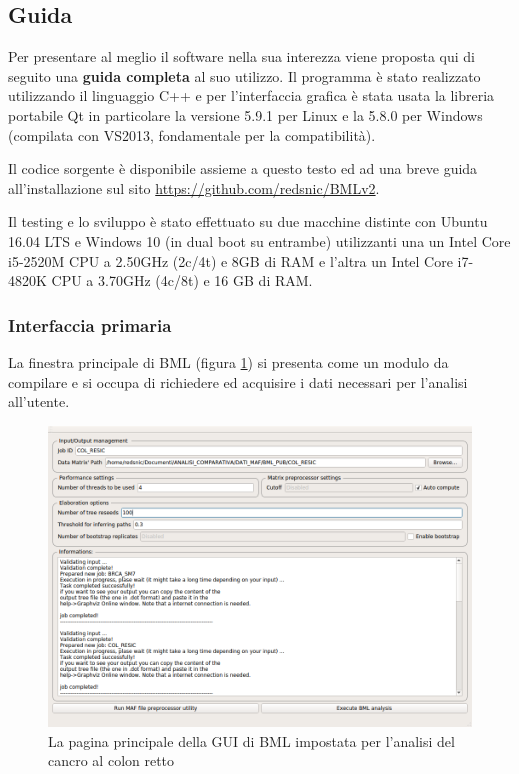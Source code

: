 \documentclass[a4paper]{article}
\begin{document}
	\subsection{\large Guida}

	Per presentare al meglio il software nella sua interezza viene proposta qui di seguito una \textbf{guida completa} al suo utilizzo. Il programma è stato realizzato utilizzando
	il linguaggio C++ e per l'interfaccia grafica è stata usata la libreria portabile Qt \cite{Qt} in particolare la versione 5.9.1 per Linux e la 
	5.8.0 per Windows (compilata con VS2013, fondamentale per la compatibilità).

	Il codice sorgente è disponibile assieme a questo testo ed ad una breve guida all'installazione sul sito \href{https://github.com/redsnic/BMLv2}{https://github.com/redsnic/BMLv2}.

	Il testing e lo sviluppo è stato effettuato su due macchine distinte con Ubuntu 16.04 LTS e Windows 10 (in dual boot su entrambe) utilizzanti una 
	un Intel Core i5-2520M CPU a 2.50GHz (2c/4t) e 8GB di RAM e l'altra un Intel Core i7-4820K CPU a 3.70GHz (4c/8t) e 16 GB di RAM.

	\subsubsection{Interfaccia primaria}
	
	La finestra principale di BML (figura \ref{fig:BMLMainMenu}) si presenta come un modulo da compilare
	e si occupa di richiedere ed acquisire i dati necessari per l'analisi 
	all'utente. 

	\begin{figure}[H]
	  \centering
	  \includegraphics[scale=0.36, keepaspectratio]{BMLMainMenu.png}%
	  \captionsetup{justification=centering,margin=0.5cm}
	  \caption{La pagina principale della GUI di BML impostata per l'analisi del cancro al colon retto} \label{fig:BMLMainMenu}
	\end{figure}
\end{document}
